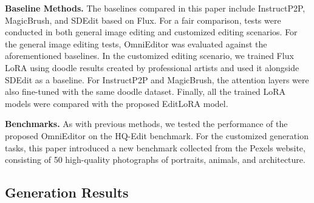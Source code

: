 


\noindent \textbf{Baseline Methods.}  The baselines compared in this paper include InstructP2P\cite{brooks2023instructpix2pix}, MagicBrush\cite{zhang2024magicbrush}, and SDEdit\cite{meng2021sdedit} based on Flux. For a fair comparison, tests were conducted in both general image editing and customized editing scenarios. For the general image editing tests, OmniEditor was evaluated against the aforementioned baselines. In the customized editing scenario, we trained Flux LoRA using doodle results created by professional artists and used it alongside SDEdit as a baseline. For InstructP2P and MagicBrush, the attention layers were also fine-tuned with the same doodle dataset. Finally, all the trained LoRA models were compared with the proposed EditLoRA model.

\noindent \textbf{Benchmarks.}  As with previous methods, we tested the performance of the proposed OmniEditor on the HQ-Edit benchmark\cite{hui2024hq}. For the customized generation tasks, this paper introduced a new benchmark collected from the Pexels website, consisting of 50 high-quality photographs of portraits, animals, and architecture.



\subsection{Generation Results}

